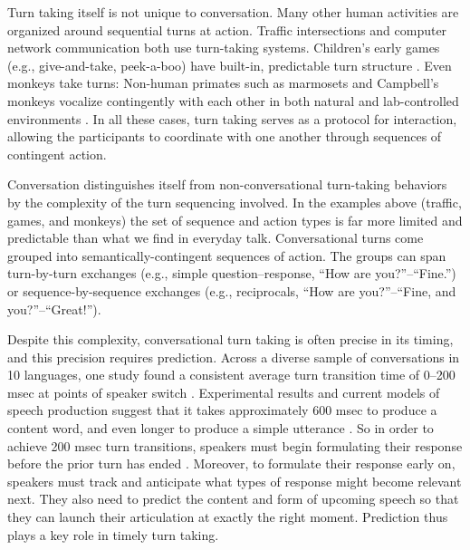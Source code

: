 \documentclass[authoryear, 12pt]{elsarticle}
\begin{document}
Turn taking itself is not unique to conversation. Many other human activities are organized around sequential turns at action. Traffic intersections and computer network communication both use turn-taking systems. Children's early games (e.g., give-and-take, peek-a-boo) have built-in, predictable turn structure \citep{ratner1978, ross1987}. Even monkeys take turns: Non-human primates such as marmosets and Campbell's monkeys vocalize contingently with each other in both natural and lab-controlled environments \citep{lemasson2011, takahashi2013}. In all these cases, turn taking serves as a protocol for interaction, allowing the participants to coordinate with one another through sequences of contingent action. 

Conversation distinguishes itself from non-conversational turn-taking behaviors by the complexity of the turn sequencing involved. In the examples above (traffic, games, and monkeys) the set of sequence and action types is far more limited and predictable than what we find in everyday talk. Conversational turns come grouped into semantically-contingent sequences of action. The groups can span turn-by-turn exchanges (e.g., simple question--response, ``How are you?''--``Fine.'') or sequence-by-sequence exchanges (e.g., reciprocals, ``How are you?''--``Fine, and you?''--``Great!''). 


Despite this complexity, conversational turn taking is often precise in its timing, and this precision requires prediction. Across a diverse sample of conversations in 10 languages, one study found a consistent average turn transition time of 0--200 msec at points of speaker switch \citep{stivers2009}. Experimental results and current models of speech production suggest that it takes approximately 600 msec to produce a content word, and even longer to produce a simple utterance \citep{griffin2000, levelt1989}. So in order to achieve 200 msec turn transitions, speakers must begin formulating their response before the prior turn has ended \citep{levinson2013}. Moreover, to formulate their response early on, speakers must track and anticipate what types of response might become relevant next. They also need to predict the content and form of upcoming speech so that they can launch their articulation at exactly the right moment. Prediction thus plays a key role in timely turn taking.
\end{document}
